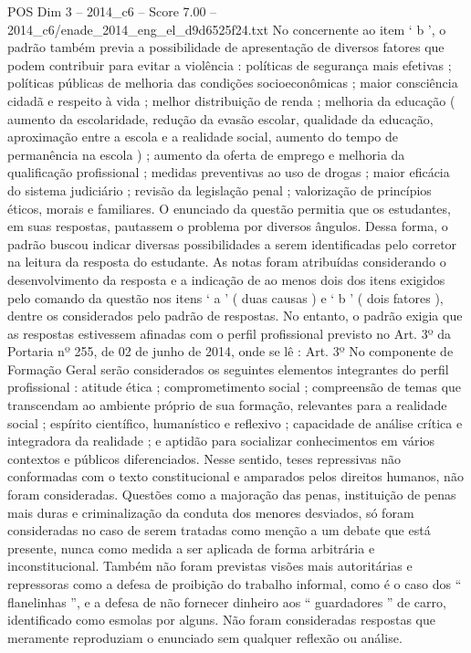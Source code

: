\begin{textsample}{POS Dim 3 – 2014\_c6 – Score 7.00 – 2014\_c6/enade\_2014\_eng\_el\_d9d6525f24.txt}
No concernente ao item ‘ b ’, o padrão também previa a possibilidade de apresentação de diversos fatores que podem contribuir para evitar a violência : políticas de segurança mais efetivas ; políticas públicas de melhoria das condições socioeconômicas ; maior consciência cidadã e respeito à vida ; melhor distribuição de renda ; melhoria da educação ( aumento da escolaridade, redução da evasão escolar, qualidade da educação, aproximação entre a escola e a realidade social, aumento do tempo de permanência na escola ) ; aumento da oferta de emprego e melhoria da qualificação profissional ; medidas preventivas ao uso de drogas ; maior eficácia do sistema judiciário ; revisão da legislação penal ; valorização de princípios éticos, morais e familiares.
O enunciado da questão permitia que os estudantes, em suas respostas, pautassem o problema por diversos ângulos.
Dessa forma, o padrão buscou indicar diversas possibilidades a serem identificadas pelo corretor na leitura da resposta do estudante.
As notas foram atribuídas considerando o desenvolvimento da resposta e a indicação de ao menos dois dos itens exigidos pelo comando da questão nos itens ‘ a ’ ( duas causas ) e ‘ b ’ ( dois fatores ), dentre os considerados pelo padrão de respostas.
No entanto, o padrão exigia que as respostas estivessem afinadas com o perfil profissional previsto no Art. 3º da Portaria nº 255, de 02 de junho de 2014, onde se lê : Art. 3º No componente de Formação Geral serão considerados os seguintes elementos integrantes do perfil profissional : atitude ética ; comprometimento social ; compreensão de temas que transcendam ao ambiente próprio de sua formação, relevantes para a realidade social ; espírito científico, humanístico e reflexivo ; capacidade de análise crítica e integradora da realidade ; e aptidão para socializar conhecimentos em vários contextos e públicos diferenciados.
Nesse sentido, teses repressivas não conformadas com o texto constitucional e amparados pelos direitos humanos, não foram consideradas.
Questões como a majoração das penas, instituição de penas mais duras e criminalização da conduta dos menores desviados, só foram consideradas no caso de serem tratadas como menção a um debate que está presente, nunca como medida a ser aplicada de forma arbitrária e inconstitucional.
Também não foram previstas visões mais autoritárias e repressoras como a defesa de proibição do trabalho informal, como é o caso dos “ flanelinhas ”, e a defesa de não fornecer dinheiro aos “ guardadores ” de carro, identificado como esmolas por alguns.
Não foram consideradas respostas que meramente reproduziam o enunciado sem qualquer reflexão ou análise.

\end{textsample}
